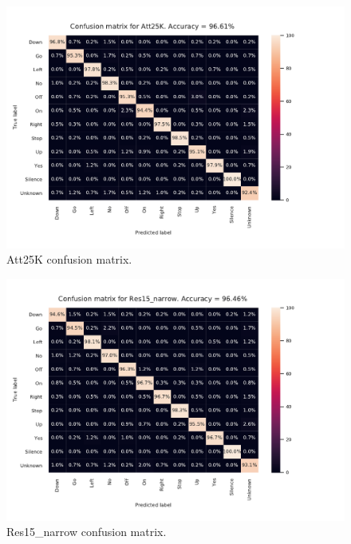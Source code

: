 
\begin{figure}[htbp]
\centerline{\includegraphics[scale=.5]{conf_att.pdf}}
\caption{Att25K confusion matrix.}
\label{conf_att}
\end{figure}

\begin{figure}[htbp]
\centerline{\includegraphics[scale=.5]{conf_res.pdf}}
\caption{Res15_narrow confusion matrix.}
\label{conf_res}
\end{figure}


